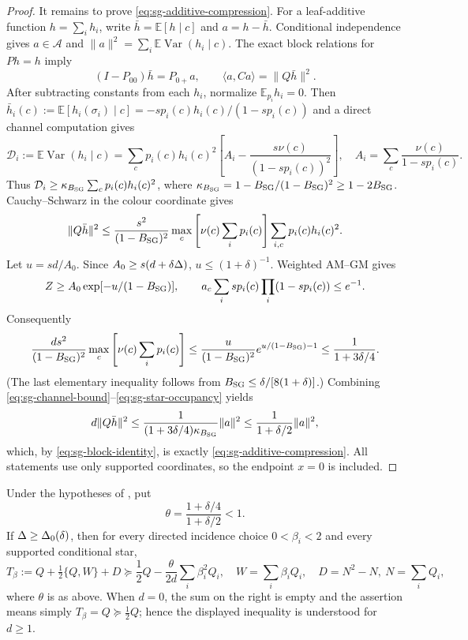 \begin{proof}
It remains to prove \eqref{eq:sg-additive-compression}.  For a leaf-additive function
$h=\sum_i h_i$, write $\bar h=\mathbb E[h\mid c]$ and $a=h-\bar h$.
Conditional independence gives
$a\in\mathcal A$ and
$\|a\|^2=\sum_i\mathbb E\operatorname{Var}(h_i\mid c)$.  The exact block
relations for $Ph=h$ imply
\begin{equation}\label{eq:sg-block-identity}
 (I-P_{00})\bar h=P_{0+}a,\qquad
 \langle a,Ca\rangle=\|Q\bar h\|^2.
\end{equation}
After subtracting constants from each $h_i$, normalize
$\mathbb E_{p_i}h_i=0$.  Then
$\bar h_i(c):=\mathbb E[h_i(\sigma_i)\mid c]=-sp_i(c)h_i(c)/(1-sp_i(c))$ and a direct channel computation gives
\[
 \mathcal D_i:=\mathbb E\operatorname{Var}(h_i\mid c)
 =\sum_cp_i(c)h_i(c)^2
 \left[A_i-\frac{s\nu(c)}{(1-sp_i(c))^2}\right],\quad
 A_i=\sum_c\frac{\nu(c)}{1-sp_i(c)}.
\]
Thus $\mathcal D_i\ge\kappa_{B_{\rm SG}}\sum_cp_i(c)h_i(c)^2$, where
$\kappa_{B_{\rm SG}}=1-B_{\rm SG}/(1-B_{\rm SG})^2\ge1-2B_{\rm SG}$.  Cauchy--Schwarz in the colour coordinate gives
\begin{equation}\label{eq:sg-channel-bound}
 \|Q\bar h\|^2\le \frac{s^2}{(1-B_{\rm SG})^2}
 \max_c\left[\nu(c)\sum_i p_i(c)\right]
 \sum_{i,c}p_i(c)h_i(c)^2.
\end{equation}
Let $u=sd/A_0$.  Since $A_0\ge s(d+\delta\Delta)$,
$u\le(1+\delta)^{-1}$.  Weighted AM--GM gives
\[
 Z\ge A_0\exp[-u/(1-B_{\rm SG})],\qquad
 a_c\sum_i sp_i(c)\prod_i(1-sp_i(c))\le e^{-1}.
\]
Consequently
\begin{equation}\label{eq:sg-star-occupancy}
 \frac{ds^2}{(1-B_{\rm SG})^2}\max_c\left[\nu(c)\sum_i p_i(c)\right]
 \le \frac{u}{(1-B_{\rm SG})^2}e^{u/(1-B_{\rm SG})-1}
 \le \frac{1}{1+3\delta/4}.
\end{equation}
(The last elementary inequality follows from $B_{\rm SG}\le\delta/[8(1+\delta)]$.)
Combining \eqref{eq:sg-channel-bound}--\eqref{eq:sg-star-occupancy} yields
\[
 d\|Q\bar h\|^2\le \frac{1}{(1+3\delta/4)\kappa_{B_{\rm SG}}}\|a\|^2
 \le \frac{1}{1+\delta/2}\|a\|^2,
\]
which, by \eqref{eq:sg-block-identity}, is exactly \eqref{eq:sg-additive-compression}.  All statements use only supported
coordinates, so the endpoint $x=0$ is included.
\end{proof}

\begin{lemma}
\label{lem:girth5-star-incidence}
Under the hypotheses of , put
\[
 \theta=\frac{1+\delta/4}{1+\delta/2}<1.
\]
If $\Delta\ge\Delta_0(\delta)$, then for every directed incidence choice
$0<\beta_i<2$ and every supported conditional star,
\begin{equation}\label{eq:sg-star-incidence}
 T_\beta:=Q+\tfrac12\{Q,W\}+D
 \succeq \frac{1}{2}Q-\frac{\theta}{2d}\sum_i\beta_i^2Q_i,
 \quad W=\sum_i\beta_iQ_i,\quad D=N^2-N,\ N=\sum_iQ_i,
\end{equation}
where $\theta$ is as above.
When $d=0$, the sum on the right is empty and the assertion means simply
$T_\beta=Q\succeq\frac12Q$; hence the displayed inequality is understood for
$d\ge1$.
\end{lemma}

